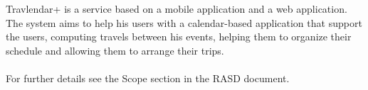 Travlendar+ is a service based on a mobile application and a web application. \\The system aims to help his users with a calendar-based application that support the users, computing travels between his events, helping them to organize their schedule and allowing them to arrange their trips. \\ \\For further details see the Scope section in the RASD document.